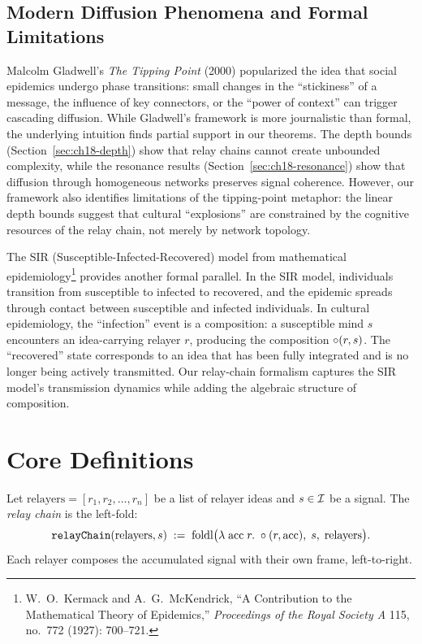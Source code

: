 \subsection{Modern Diffusion Phenomena and Formal Limitations}

Malcolm Gladwell's \textit{The Tipping Point} (2000) popularized the idea
that social epidemics undergo phase transitions: small changes in the
``stickiness'' of a message, the influence of key connectors, or the
``power of context'' can trigger cascading diffusion.  While Gladwell's
framework is more journalistic than formal, the underlying intuition finds
partial support in our theorems.  The depth bounds
(Section~\ref{sec:ch18-depth}) show that relay chains cannot create
unbounded complexity, while the resonance results
(Section~\ref{sec:ch18-resonance}) show that diffusion through homogeneous
networks preserves signal coherence.  However, our framework also
identifies limitations of the tipping-point metaphor: the linear depth
bounds suggest that cultural ``explosions'' are constrained by the
cognitive resources of the relay chain, not merely by network topology.

The SIR (Susceptible-Infected-Recovered) model from mathematical
epidemiology\footnote{W.\ O.\ Kermack and A.\ G.\ McKendrick, ``A
Contribution to the Mathematical Theory of Epidemics,'' \textit{Proceedings
of the Royal Society A} 115, no.\ 772 (1927): 700--721.} provides another
formal parallel.  In the SIR model, individuals transition from susceptible
to infected to recovered, and the epidemic spreads through contact between
susceptible and infected individuals.  In cultural epidemiology, the
``infection'' event is a composition: a susceptible mind $s$ encounters an
idea-carrying relayer $r$, producing the composition $\circ(r, s)$.
The ``recovered'' state corresponds to an idea that has been fully
integrated and is no longer being actively transmitted.  Our relay-chain
formalism captures the SIR model's transmission dynamics while adding the
algebraic structure of composition.

\section{Core Definitions}
\label{sec:ch18-defs}

\begin{definition}
\label{def:relayChain}
Let $\text{relayers} = [r_1, r_2, \ldots, r_n]$ be a list of relayer ideas
and $s \in \mathcal{I}$ be a signal.  The \emph{relay chain} is the left-fold:
\[
  \texttt{relayChain}(\text{relayers}, s) \;:=\;
  \text{foldl}\bigl(\lambda\;\text{acc}\;r.\;\circ(r, \text{acc}),\;
  s,\; \text{relayers}\bigr).
\]
Each relayer composes the accumulated signal with their own frame,
left-to-right.
\end{definition}

